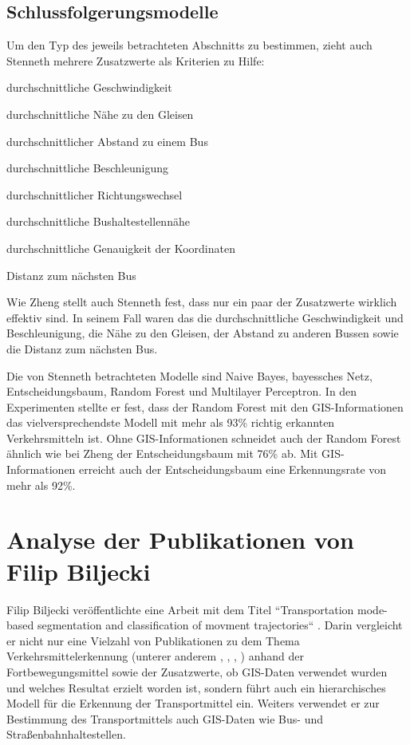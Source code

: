 \subsection{Schlussfolgerungsmodelle}
Um den Typ des jeweils betrachteten Abschnitts zu bestimmen, zieht auch Stenneth mehrere Zusatzwerte als Kriterien zu Hilfe:

\begin{pitemize}
\item durchschnittliche Geschwindigkeit
\item durchschnittliche Nähe zu den Gleisen
\item durchschnittlicher Abstand zu einem Bus
\item durchschnittliche Beschleunigung
\item durchschnittlicher Richtungswechsel
\item durchschnittliche Bushaltestellennähe
\item durchschnittliche Genauigkeit der Koordinaten
\item Distanz zum nächsten Bus
\end{pitemize}

Wie Zheng stellt auch Stenneth fest, dass nur ein paar der Zusatzwerte wirklich effektiv sind. In seinem Fall waren das die durchschnittliche Geschwindigkeit und Beschleunigung, die Nähe zu den Gleisen, der Abstand zu anderen Bussen sowie die Distanz zum nächsten Bus.

Die von Stenneth betrachteten Modelle sind Naive Bayes, bayessches Netz, Entscheidungsbaum, Random Forest und Multilayer Perceptron. In den Experimenten stellte er fest, dass der Random Forest mit den GIS-Informationen das vielversprechendste Modell mit mehr als 93\% richtig erkannten Verkehrsmitteln ist. Ohne GIS-Informationen schneidet auch der Random Forest ähnlich wie bei Zheng der Entscheidungsbaum mit 76\% ab. Mit GIS-Informationen erreicht auch der Entscheidungsbaum eine Erkennungsrate von mehr als 92\%. 

\section{Analyse der Publikationen von Filip Biljecki}
Filip Biljecki veröffentlichte eine Arbeit mit dem Titel ``Transportation mode-based segmentation and classification of movment trajectories`` \cite{biljecki_transportation_2013}. Darin vergleicht er nicht nur eine Vielzahl von Publikationen zu dem Thema Verkehrsmittelerkennung (unterer anderem \cite{schuessler_processing_2009}, \cite{zheng_understanding_2010}, \cite{reddy_using_2010}, \cite{gonzalez_automating_2010}) anhand der Fortbewegungsmittel sowie der Zusatzwerte, ob GIS-Daten verwendet wurden und welches Resultat erzielt worden ist, sondern führt auch ein hierarchisches Modell für die Erkennung der Transportmittel ein. Weiters verwendet er zur Bestimmung des Transportmittels auch GIS-Daten wie Bus- und Straßenbahnhaltestellen.

